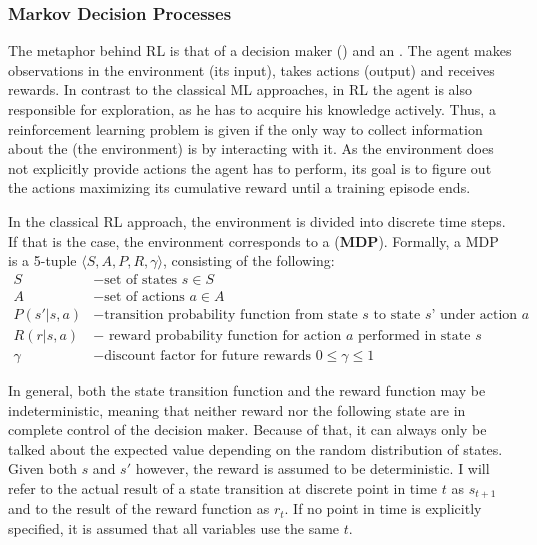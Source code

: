 \subsubsection{Markov Decision Processes}

The metaphor behind RL is that of a decision maker () and an . The agent makes observations in the environment (its input), takes actions (output) and receives rewards. In contrast to the classical ML approaches, in RL the agent is also responsible for exploration, as he has to acquire his knowledge actively. Thus, a reinforcement learning problem is given if the only way to collect information about the  (the environment) is by interacting with it. As the environment does not explicitly provide actions the agent has to perform, its goal is to figure out the actions maximizing its cumulative reward until a training episode ends.

In the classical RL approach, the environment is divided into discrete time steps. If that is the case, the environment corresponds to a  (\textbf{MDP}). Formally, a MDP is a 5-tuple $\langle S, A, P, R, \gamma \rangle$, consisting of the following:\\
\begin{align*}
S &- \text{set of states } s\in S\\
A &- \text{set of actions } a \in A\\
P(s'|s, a) &- \text{transition probability function from state } s \text{ to state } s’ \text{ under action } a\\
R(r|s, a) &- \text{ reward probability function for action } a \text{ performed in state } s \\
\gamma &- \text{discount factor for future rewards } 0 \leq \gamma \leq 1
\end{align*}

In general, both the state transition function and the reward function may be indeterministic, meaning that neither reward nor the following state are in complete control of the decision maker. Because of that, it can always only be talked about the expected value depending on the random distribution of states. Given both $s$ and $s'$ however, the reward is assumed to be deterministic. I will refer to the actual result of a state transition at discrete point in time $t$ as $s_{t+1}$ and to the result of the reward function as $r_t$. If no point in time is explicitly specified, it is assumed that all variables use the same $t$.

